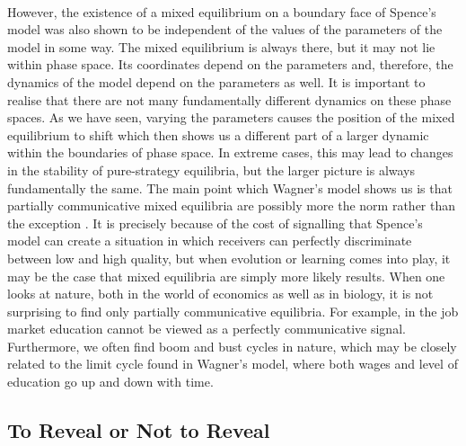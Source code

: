 \documentclass[a4paper,10pt]{article}
\numberwithin{equation}{section}
\begin{document}
\\
However, the existence of a mixed equilibrium on a boundary face of Spence's model was also shown to be independent of the values of the parameters of the model in some way. The mixed equilibrium is always there, but it may not lie within phase space. Its coordinates depend on the parameters and, therefore, the dynamics of the model depend on the parameters as well. It is important to realise that there are not many fundamentally different dynamics on these phase spaces. As we have seen, varying the parameters causes the position of the mixed equilibrium to shift which then shows us a different part of a larger dynamic within the boundaries of phase space. In extreme cases, this may lead to changes in the stability of pure-strategy equilibria, but the larger picture is always fundamentally the same. The main point which Wagner's model shows us is that partially communicative mixed equilibria are possibly more the norm rather than the exception \cite{Wagner2010}. It is precisely because of the cost of signalling that Spence's model can create a situation in which receivers can perfectly discriminate between low and high quality, but when evolution or learning comes into play, it may be the case that mixed equilibria are simply more likely results. When one looks at nature, both in the world of economics as well as in biology, it is not surprising to find only partially communicative equilibria. For example, in the job market education cannot be viewed as a perfectly communicative signal. Furthermore, we often find boom and bust cycles in nature, which may be closely related to the limit cycle found in Wagner's model, where both wages and level of education go up and down with time.

\subsection{To Reveal or Not to Reveal}
\label{sec:To Reveal or Not to Reveal}
\end{document}
